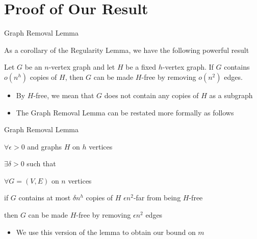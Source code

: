 \section{Proof of Our Result}
\begin{frame}{Graph Removal Lemma}

As a corollary of the Regularity Lemma, we have the following powerful result
\begin{lemma}
	Let $G$ be an $n$-vertex graph and let $H$ be a fixed $h$-vertex graph. If $G$ contains $o(n^h)$ copies of $H$, then $G$ can be made $H$-free by removing $o(n^2)$ edges.
\end{lemma}

\begin{itemize}
	\item By $H$-free, we mean that $G$ does not contain any copies of $H$ as a subgraph
	\item The Graph Removal Lemma can be restated more formally as follows
\end{itemize}

\end{frame}

\begin{frame}{Graph Removal Lemma}
\begin{lemma}
	$\forall \epsilon > 0$ and graphs $H$ on $h$ vertices
	\begin{description}[abc]
		\item[$\bullet$] $\exists \delta > 0$ such that
		\begin{description}[abc]
			\item[$\bullet$] $\forall G = (V,E)$ on $n$ vertices
			\begin{description}[abc]
				\item[$\bullet$] if $G$ contains at most $\delta n^h$ copies of $H$ $\epsilon n^2$-far from being $H$-free
				\begin{description}[abc]
					\item[$\bullet$] then $G$ can be made $H$-free by removing $\epsilon n^2$ edges
				\end{description}
			\end{description}
		\end{description}
	\end{description}
\end{lemma}

\begin{itemize}
	\item We use this version of the lemma to obtain our bound on $m$
\end{itemize}

\end{frame}

